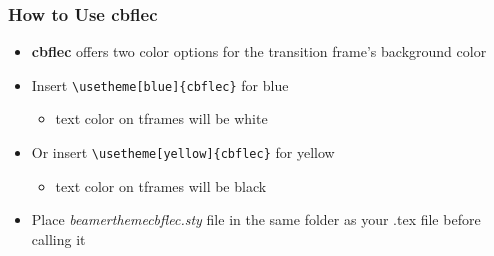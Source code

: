 \documentclass[11pt, aspectratio=43]{beamer}
\begin{document}
\begin{frame}[fragile]
    \frametitle{How to Use \textbf{cbflec}}
    \begin{itemize}
        \item \textbf{cbflec} offers two color options for the transition frame's background color
        \item Insert \verb!\usetheme[blue]{cbflec}! for blue
        \begin{itemize}
            \item text color on tframes will be white
        \end{itemize}
        \item Or insert \verb|\usetheme[yellow]{cbflec}| for yellow
        \begin{itemize}
            \item text color on tframes will be black
        \end{itemize}
        \item Place \textit{beamerthemecbflec.sty} file in the same folder as your .tex file before calling it
    \end{itemize}
\end{frame}
\end{document}

